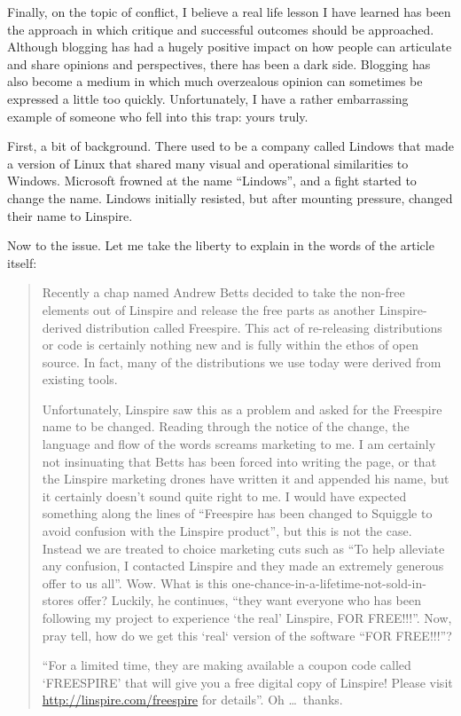 Finally, on the topic of conflict, I believe a real life lesson I have learned
has been the approach in which critique and successful outcomes should be
approached. Although blogging has had a hugely positive impact on how people can
articulate and share opinions and perspectives, there has been a dark side.
Blogging has also become a medium in which much overzealous opinion can
sometimes be expressed a little too quickly. Unfortunately, I have a rather
embarrassing example of someone who fell into this trap: yours truly.

First, a bit of background. There used to be a company called Lindows that made
a version of Linux that shared many visual and operational similarities to
Windows. Microsoft frowned at the name ``Lindows'', and a fight started to
change the name. Lindows initially resisted, but after mounting pressure,
changed their name to Linspire.

Now to the issue. Let me take the liberty to explain in the words of the article
itself:
\begin{quote}
 Recently a chap named Andrew Betts decided to take the non-free elements out of
Linspire and release the free parts as another Linspire-derived distribution
called Freespire. This act of re-releasing distributions or code is certainly
nothing new and is fully within the ethos of open source. In fact, many of the
distributions we use today were derived from existing tools.

Unfortunately, Linspire saw this as a problem and asked for the Freespire name
to be changed. Reading through the notice of the change, the language and flow
of the words screams marketing to me. I am certainly not insinuating that Betts
has been forced into writing the page, or that the Linspire marketing drones
have written it and appended his name, but it certainly doesn’t sound quite
right to me. I would have expected something along the lines of ``Freespire has
been changed to Squiggle to avoid confusion with the Linspire product'', but
this is not the case. Instead we are treated to choice marketing cuts such as
``To help alleviate any confusion, I contacted Linspire and they made an
extremely generous offer to us all''. Wow. What is this
one-chance-in-a-lifetime-not-sold-in-stores offer? Luckily, he continues, ``they
want everyone who has been following my project to experience ‘the real’
Linspire, FOR FREE!!!''. Now, pray tell, how do we get this ‘real‘ version of
the software ``FOR FREE!!!''?

``For a limited time, they are making available a coupon code called ‘FREESPIRE’
that will give you a free digital copy of Linspire! Please visit
\url{http://linspire.com/freespire} for details''. Oh \dots\ thanks.
\end{quote}

